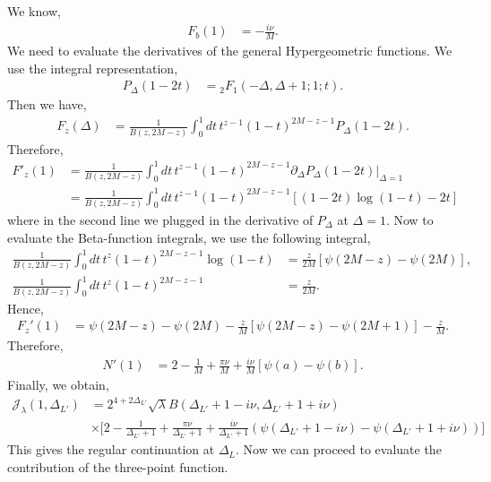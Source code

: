 \documentclass[11pt]{article}
\newcommand{\p}{\partial}
\newcommand{\nn}{\nonumber}
\newcommand{\lb}{\left(}
\newcommand{\rb}{\right)}
\begin{document}
We know, 
\begin{align}
    F_b(1) &= -\frac{i \nu}{M}.
\end{align}
We need to evaluate the derivatives of the general Hypergeometric functions. We use the integral representation,
\begin{align}
    P_\Delta(1-2t) &= {}_2F_1(-\Delta,\Delta +1 ;1;t).
\end{align}
Then we have,
\begin{align}
    F_z(\Delta) &= \frac{1}{B(z,2M-z)}\int_0^1 dt\, t^{z-1}(1-t)^{2M-z-1}P_\Delta(1-2t).
\end{align}
Therefore, 
\begin{align}
    F'_z(1) &= \frac{1}{B(z,2M-z)}\int_0^1 dt\, t^{z-1}(1-t)^{2M-z-1}\p_\Delta P_\Delta(1-2t)\Big|_{\Delta = 1}\\
    &= \frac{1}{B(z,2M-z)}\int_0^1 dt\, t^{z-1}(1-t)^{2M-z-1}[(1-2t)\log (1-t) -2t]
\end{align}
where in the second line we plugged in the derivative of $P_\Delta$ at $\Delta = 1$. Now to evaluate the Beta-function integrals, we use the following integral,
\begin{align}
    \frac{1}{B(z,2M-z)}\int_0^1 dt\, t^{z}(1-t)^{2M-z-1}\log (1-t)  &= \frac{z}{2M}[\psi(2M-z) - \psi(2M)],\\
    \frac{1}{B(z,2M-z)}\int_0^1 dt\, t^{z}(1-t)^{2M-z-1} &= \frac{z}{2M}.
\end{align}
Hence, 
\begin{align}
    F_z'(1) &= \psi(2M-z) - \psi(2M) - \frac{z}{M}[\psi(2M-z) - \psi(2M+1)] - \frac{z}{M}.
\end{align}
Therefore, 
\begin{align}
    N'(1) &= 2-\frac{1}{M} + \frac{\pi \nu}{M} + \frac{i\nu}{M}[\psi(a)-\psi(b)].
\end{align}
Finally, we obtain,
\begin{align}
    \mathcal{J}_\lambda(1,\Delta_{L'}) &= 2^{4+2\Delta_{L'}}\sqrt\lambda B(\Delta_{L'}+1-i\nu,\Delta_{L'}+1 + i\nu) \nn \\
    &\times\Big[ 2 - \frac{1}{\Delta_{L'}+1} +\frac{\pi\nu}{\Delta_{L'}+1} + \frac{i\nu}{\Delta_{L'}+1} \lb \psi(\Delta_{L'}+1-i\nu) - \psi(\Delta_{L'}+1+i\nu)\rb\Big]
\end{align}
This gives the regular continuation at $\Delta_L$. Now we can proceed to evaluate the contribution of the three-point function. 
\end{document}
